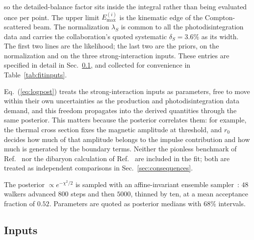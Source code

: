 \documentclass[
  aps,prd,twocolumn,nofootinbib,superscriptaddress,
  longbibliography,floatfix,preprintnumbers
]{revtex4-2}
\begin{document}
so the detailed-balance factor sits inside the integral rather than being evaluated once
per point. The upper limit $E_{\mathrm{max}}^{(i)}$ is the kinematic edge of the
Compton-scattered beam. The normalization $\lambda_{S}$ is common to all the
photodisintegration data and carries the collaboration's quoted systematic
$\delta_{S}=3.6\%$ as its width. The first two lines are the likelihood; the last two
are the priors, on the normalization and on the three strong-interaction inputs. 
These entries are specified in detail in Sec.~\ref{sec:inputs}, and collected for
convenience in Table~\ref{tab:fitinputs}.

Eq.~(\ref{eq:logpost}) treats the strong-interaction inputs as parameters, free to move within their own
uncertainties as the production and photodisintegration data demand, and this
freedom propagates into the derived quantities through the same posterior. This
matters because the posterior correlates them: for example, the thermal
cross section fixes the magnetic amplitude at threshold, and $r_{0}$ decides how
much of that amplitude belongs to the impulse contribution and how much is generated by the boundary terms. 
Neither the pionless benchmark of Ref.~\cite{Rupak:1999rk} nor the dibaryon calculation of
Ref.~\cite{Ando:2005cz} are included in the fit; both are treated as independent
comparisons in Sec.~\ref{sec:consequences}.

The posterior $\propto e^{-\chi^{2}/2}$ is sampled with an affine-invariant
ensemble sampler~\cite{Goodman:2010dyf,Foreman-Mackey:2012any}: $48$ walkers
advanced $800$ steps and then $5000$, thinned by ten, at a mean acceptance
fraction of $0.52$. Parameters are quoted as posterior medians with $68\%$
intervals.

\subsection{Inputs}
\label{sec:inputs}
\end{document}
